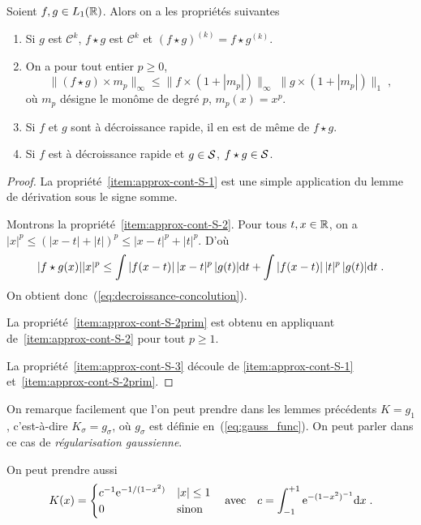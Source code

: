 \begin{lemma}\label{lem:regulairsation-est-reguliere}
  Soient $f,g\in L_1(\mathbb{R})$. Alors on a les propri{\'e}t{\'e}s suivantes
  \begin{enumerate}[label=(\roman*)]
  \item\label{item:approx-cont-S-1} Si $g$ est $\mathcal{C}^k$, $f\star g$ est
  $\mathcal{C}^k$ et $(f\star g)^{(k)}=f\star g^{(k)}$.
\item\label{item:approx-cont-S-2} On a pour tout entier $p\geq0$,
  \begin{equation}
    \label{eq:decroissance-concolution}
    \|(f\star g)\times m_p\|_\infty\leq \|f\times (1+|m_p|)\|_\infty \;
    \|g\times (1+|m_p|)\|_1  \;,
  \end{equation}
o{\`u} $m_p$ d{\'e}signe le mon{\^o}me de degr{\'e} $p$, $m_p(x)=x^p$.
\item \label{item:approx-cont-S-2prim} Si $f$ et $g$ sont {\`a} d{\'e}croissance rapide,
  il en est de m{\^e}me de $f\star g$.
\item\label{item:approx-cont-S-3}  Si $f$ est {\`a} d{\'e}croissance rapide et
  $g\in\mathcal{S}$, $f\star g\in\mathcal{S}$.
  \end{enumerate}
\end{lemma}
\begin{proof}
  La propri{\'e}t{\'e}~\ref{item:approx-cont-S-1} est une simple application du lemme
  de d{\'e}rivation sous le signe somme.

Montrons la propri{\'e}t{\'e}~\ref{item:approx-cont-S-2}.
Pour tous $t,x\in\mathbb{R}$, on a $|x|^p\leq(|x-t|+|t|)^p\leq|x-t|^p+|t|^p$.
D'o{\`u}
$$
|f\star g(x)||x|^p \leq \int |f(x-t)|\,|x-t|^p\,|g(t)|\mathrm{d} t+
\int |f(x-t)|\,|t|^p\,|g(t)|\mathrm{d} t \;.
$$
On obtient donc~(\ref{eq:decroissance-concolution}).

La propri{\'e}t{\'e}~\ref{item:approx-cont-S-2prim} est obtenu en appliquant
de~\ref{item:approx-cont-S-2} pour tout $p\geq1$.

La propri{\'e}t{\'e}~\ref{item:approx-cont-S-3} d{\'e}coule de \ref{item:approx-cont-S-1}
et~\ref{item:approx-cont-S-2prim}.
\end{proof}

\begin{remark}
On remarque facilement que l'on peut prendre dans les lemmes pr{\'e}c{\'e}dents
$K=g_1$, c'est-{\`a}-dire $K_\sigma=g_\sigma$, o{\`u} $g_\sigma$ est d{\'e}finie
en~(\ref{eq:gauss_func}). On peut parler dans ce cas de \emph{r{\'e}gularisation
  gaussienne}.

On peut prendre aussi
\begin{equation}
\label{eq:noyau-support-borne}
K(x)=
\begin{cases}
c^{-1} \mathrm{e}^{-1/(1-x^2)} & |x| \leq 1 \\
0    & \text{sinon}
\end{cases}
\quad \text{avec} \quad c = \int_{-1}^{+1} \mathrm{e}^{-(1-x^2)^{-1}} \mathrm{d} x \;.
\end{equation}

\end{remark}

